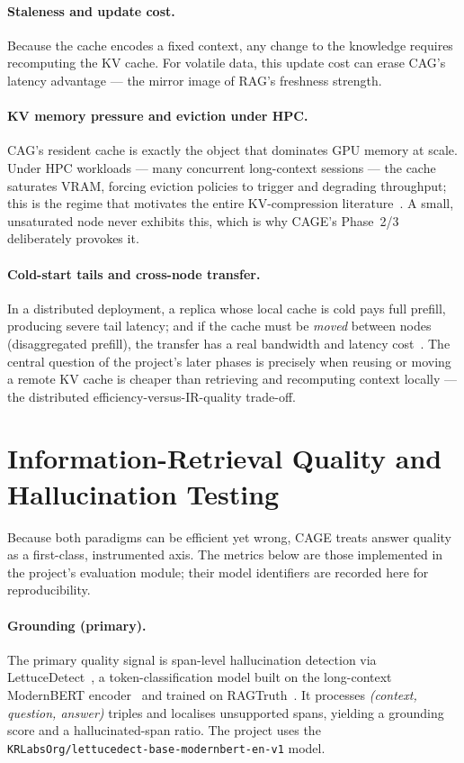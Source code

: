 \documentclass[12pt,a4paper]{article}
\let\cite\citep
\begin{document}
\paragraph{Staleness and update cost.} Because the cache encodes a fixed context,
any change to the knowledge requires recomputing the KV cache. For volatile data,
this update cost can erase CAG's latency advantage --- the mirror image of RAG's
freshness strength.

\paragraph{KV memory pressure and eviction under HPC.} CAG's resident cache is
exactly the object that dominates GPU memory at scale. Under HPC workloads --- many
concurrent long-context sessions --- the cache saturates VRAM, forcing eviction
policies to trigger and degrading throughput; this is the regime that motivates the
entire KV-compression literature~\cite{li2024kvsurvey, kvcompresssurvey}. A small,
unsaturated node never exhibits this, which is why CAGE's Phase~2/3 deliberately
provokes it.

\paragraph{Cold-start tails and cross-node transfer.} In a distributed deployment,
a replica whose local cache is cold pays full prefill, producing severe tail
latency; and if the cache must be \emph{moved} between nodes (disaggregated
prefill), the transfer has a real bandwidth and latency
cost~\cite{qin2024mooncake, lmcache}. The central question of the project's later
phases is precisely when reusing or moving a remote KV cache is cheaper than
retrieving and recomputing context locally --- the distributed efficiency-versus-IR-quality
trade-off.

\section{Information-Retrieval Quality and Hallucination Testing}
\label{sec:irquality}

Because both paradigms can be efficient yet wrong, CAGE treats answer quality as a
first-class, instrumented axis. The metrics below are those implemented in the
project's evaluation module; their model identifiers are recorded here for
reproducibility.

\paragraph{Grounding (primary).} The primary quality signal is span-level
hallucination detection via LettuceDetect~\cite{lettucedetect}, a token-classification
model built on the long-context ModernBERT encoder~\cite{modernbert} and trained on
RAGTruth~\cite{ragtruth}. It processes \emph{(context, question, answer)} triples
and localises unsupported spans, yielding a grounding score and a
hallucinated-span ratio. The project uses the
\texttt{KRLabsOrg/lettucedect-base-modernbert-en-v1} model.
\end{document}
